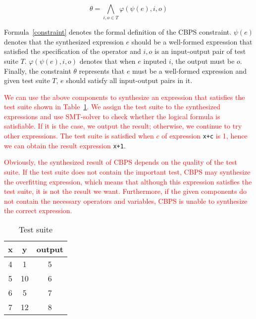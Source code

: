 \documentclass[a4paper,11pt,oneside,openany]{book}
\begin{document}
\begin{equation}
\label{constraint}
\theta=\bigwedge_{i,o\in T}^{}\varphi(\psi(e),i,o)
\end{equation}

Formula~\ref{constraint} denotes the formal definition of the CBPS constraint. $\psi(e)$ denotes that the synthesized expression $e$ should be a well-formed expression that satisfied the specification of the operator and $i,o$ is an input-output pair of test suite $T$. $\varphi(\psi(e),i,o)$ denotes that when $e$ inputed $i$, the output must be $o$. Finally, the constraint $\theta$ represents that $e$ must be a well-formed expression and given test suite $T$, $e$ should satisfy all input-output pairs in it.

\textcolor{red}{We can use the above components to synthesize an expression that satisfies the test suite shown in Table~\ref{testsuite}. We assign the test suite to the synthesized expressions and use SMT-solver to check whether the logical formula is satisfiable. If it is the case, we output the result; otherwise, we continue to try other expressions. The test suite is satisfied when $c$ of expression} \verb|x+c| \textcolor{red}{is 1, hence we can obtain the result expression} \verb|x+1|.

\textcolor{red}{Obviously, the synthesized result of CBPS depends on the quality of the test suite. If the test suite does not contain the important test, CBPS may synthesize the overfitting expression, which means that although this expression satisfies the test suite, it is not the result we want. Furthermore, if the given components do not contain the necessary operators and variables, CBPS is unable to synthesize the correct expression.}

\begin{table}[h]
  \caption{Test suite}
  \label{testsuite}
  \centering
  \begin{tabular}{|c|c|c|}
    \hline
     x & y & output \\
    \hline
     4 & 1 & 5 \\
     5 & 10 & 6 \\
     6 & 5 & 7 \\
     7 & 12 & 8 \\
    \hline
  \end{tabular}
\end{table}





\end{document}

